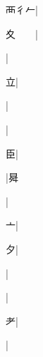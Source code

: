 \begin{multicols}{2}
{{\cjk{}襾{彳}{\cnxHanaA{}𠂉}}|{}\par
{\cjk{}夊{\cnsym{}　}{\cnsym{}　}}|{}\par
{}|{}\par
{\cjk{}{\cnsym{}　}{\cnsym{}　}立}|{}\par
{\cjk{}{\cnsym{}　}{\cnsym{}　}{\cnsym{}　}}|{}\par
{}|{}\par
{\cjk{}{\cnsym{}　}{\cnsym{}　}臣}|{}\par
{\cjk{}{\cnsym{}　}{\cnsym{}　}{\cnsym{}　}}|{\cjk{}曻}\par
{\cjk{}{\cnsym{}　}{\cnsym{}　}{\cnsym{}　}}|{}\par
{\cjk{}{\cnsym{}　}{\cnsym{}　}亠}|{}\par
{\cjk{}{\cnsym{}　}{\cnsym{}　}夕}|{}\par
{\cjk{}{\cnsym{}　}{\cnsym{}　}{\cnsym{}　}}|{}\par
{\cjk{}{\cnsym{}　}{\cnsym{}　}{\cnsym{}　}}|{}\par
{\cjk{}{\cnsym{}　}{\cnsym{}　}耂}|{}\par
{\cjk{}{\cnsym{}　}{\cnsym{}　}{\cnsym{}　}}|{}\par
}
\end{multicols}
